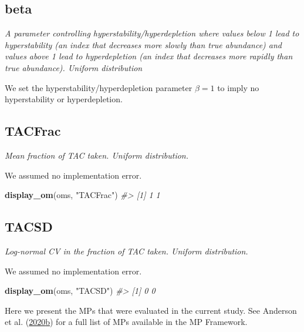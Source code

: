 \documentclass[11pt]{book}
\newenvironment{Shaded}{}{}
\newcommand{\KeywordTok}[1]{\textcolor[rgb]{0.00,0.44,0.13}{\textbf{{#1}}}}
\newcommand{\StringTok}[1]{\textcolor[rgb]{0.25,0.44,0.63}{{#1}}}
\newcommand{\CommentTok}[1]{\textcolor[rgb]{0.38,0.63,0.69}{\textit{{#1}}}}
\newcommand{\NormalTok}[1]{{#1}}
\begin{document}
\label{app:desc-obs-beta-yelloweye}
\subsection{beta}

\emph{A parameter controlling hyperstability/hyperdepletion where values below 1 lead to hyperstability (an index that decreases more slowly than true abundance) and values above 1 lead to hyperdepletion (an index that decreases more rapidly than true abundance). Uniform distribution}

We set the hyperstability/hyperdepletion parameter \(\beta = 1\) to imply no hyperstability or hyperdepletion.

\label{app:desc-imp-yelloweye}

\label{app:desc-imp-tacfrac-yelloweye}
\subsection{TACFrac}

\emph{Mean fraction of TAC taken. Uniform distribution.}

We assumed no implementation error.
\begin{Shaded}
\begin{Highlighting}[]
\KeywordTok{display_om}\NormalTok{(oms, }\StringTok{"TACFrac"}\NormalTok{)}
\CommentTok{#> [1] 1 1}
\end{Highlighting}
\end{Shaded}
\label{app:desc-imp-tacsd-yelloweye}
\subsection{TACSD}

\emph{Log-normal CV in the fraction of TAC taken. Uniform distribution.}

We assumed no implementation error.
\begin{Shaded}
\begin{Highlighting}[]
\KeywordTok{display_om}\NormalTok{(oms, }\StringTok{"TACSD"}\NormalTok{)}
\CommentTok{#> [1] 0 0}
\end{Highlighting}
\end{Shaded}
\newpage


\clearpage

\label{app:mps}

Here we present the MPs that were evaluated in the current study. See Anderson et al. (\protect\hyperlink{ref-anderson2020gfmp}{2020}\protect\hyperlink{ref-anderson2020gfmp}{b}) for a full list of MPs available in the MP Framework.
\end{document}
